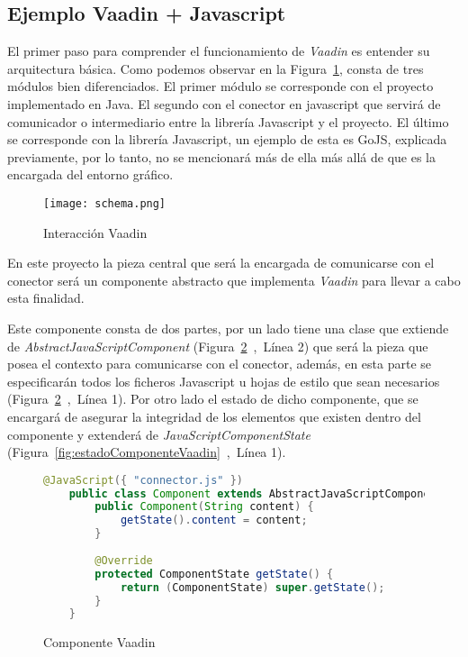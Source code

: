 \subsection{Ejemplo Vaadin + Javascript}

El primer paso para comprender el funcionamiento de \emph{Vaadin} es entender su arquitectura básica. Como podemos observar en la Figura~\ref{fig:schema}, consta de tres módulos bien diferenciados. El primer módulo se corresponde con el proyecto implementado en Java. El segundo con el conector en javascript que servirá de comunicador o intermediario entre la librería Javascript y el proyecto. El último se corresponde con la librería Javascript, un ejemplo de esta es GoJS, explicada previamente, por lo tanto, no se mencionará más de ella más allá de que es la encargada del entorno gráfico.



\begin{figure}[!tb]
	\centering
	\texttt{[image: schema.png]}
	\caption{Interacción Vaadin}\label{fig:schema}
\end{figure}




En este proyecto la pieza central que será la encargada de comunicarse con el conector será un componente abstracto que implementa \emph{Vaadin} para llevar a cabo esta finalidad.

Este componente consta de dos partes, por un lado tiene una clase que extiende de \emph{AbstractJavaScriptComponent} (Figura~\ref{fig:componenteVaadin}~,~Línea 2) que será la pieza que posea el contexto para comunicarse con el conector, además, en esta parte se especificarán todos los ficheros Javascript u hojas de estilo que sean necesarios (Figura~\ref{fig:componenteVaadin}~,~Línea 1). Por otro lado el estado de dicho componente, que se encargará de asegurar la integridad de los elementos que existen dentro del componente y extenderá de \emph{JavaScriptComponentState} (Figura~\ref{fig:estadoComponenteVaadin}~,~Línea 1).

\begin{figure}[!tb]
	\centering
	\begin{lstlisting}[language=Java]
	@JavaScript({ "connector.js" })
	public class Component extends AbstractJavaScriptComponent {
		public Component(String content) {
			getState().content = content;
		}
		
		@Override
		protected ComponentState getState() {
			return (ComponentState) super.getState();
		}
	}\end{lstlisting}
	\caption{Componente Vaadin}
	\label{fig:componenteVaadin}
\end{figure}


